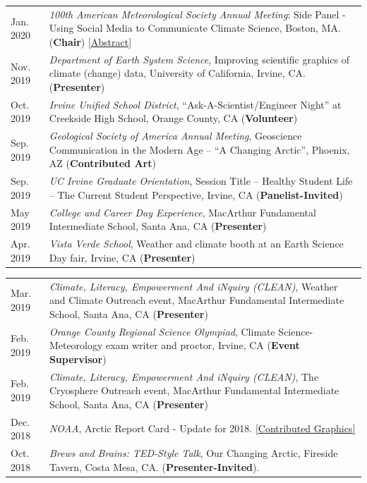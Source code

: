 \documentclass[margin,line,palatino,courier,10pt]{res}
\begin{document}
\begin{resume}
\begin{tabular}{@{}p{0.9in}p{4in}}
Jan. 2020 & \textit{100th American Meteorological Society Annual Meeting}: Side Panel - Using Social Media to Communicate Climate Science, Boston, MA. (\textbf{Chair}) \href{https://ams.confex.com/ams/2020Annual/meetingapp.cgi/Session/53195}{[Abstract]}\\
Nov. 2019 & \textit{Department of Earth System Science}, Improving scientific graphics of climate (change) data, University of California, Irvine, CA. (\textbf{Presenter})\\
Oct. 2019 & \textit{Irvine Unified School District}, ``Ask-A-Scientist/Engineer Night'' at Creekside High School, Orange County, CA (\textbf{Volunteer})\\
Sep. 2019 & \textit{Geological Society of America Annual Meeting}, Geoscience Communication in the Modern Age -- ``A Changing Arctic'', Phoenix, AZ (\textbf{Contributed Art})\\
Sep. 2019 & \textit{UC Irvine Graduate Orientation}, Session Title -- Healthy Student Life -- The Current Student Perspective, Irvine, CA (\textbf{Panelist-Invited})\\
May 2019 & \textit{College and Career Day Experience}, MacArthur Fundamental Intermediate School, Santa Ana, CA (\textbf{Presenter})\\
Apr. 2019 & \textit{Vista Verde School}, Weather and climate booth at an Earth Science Day fair, Irvine, CA (\textbf{Presenter})\\
\end{tabular}
\begin{tabular}{@{}p{0.9in}p{4in}}
Mar. 2019 & \textit{Climate, Literacy, Empowerment And iNquiry (CLEAN)}, Weather and Climate Outreach event, MacArthur Fundamental Intermediate School, Santa Ana, CA (\textbf{Presenter})\\
Feb. 2019 & \textit{Orange County Regional Science Olympiad}, Climate Science-Meteorology exam writer and proctor, Irvine, CA (\textbf{Event Supervisor})\\
Feb. 2019 & \textit{Climate, Literacy, Empowerment And iNquiry (CLEAN)}, The Cryosphere Outreach event, MacArthur Fundamental Intermediate School, Santa Ana, CA (\textbf{Presenter})\\
Dec. 2018 & \textit{NOAA}, Arctic Report Card - Update for 2018. \href{https://www.youtube.com/watch?v=XntO9a-NpeM}{[Contributed Graphics]}\\
Oct. 2018 & \textit{Brews and Brains: TED-Style Talk}, Our Changing Arctic, Fireside Tavern, Costa Mesa, CA. (\textbf{Presenter-Invited}).\\

\end{tabular}
\end{resume}
\end{document}
